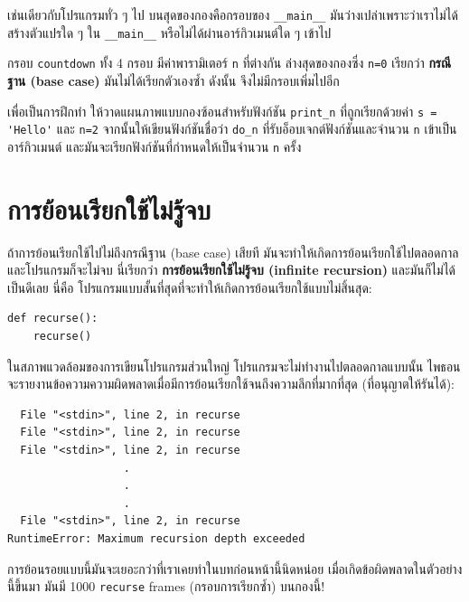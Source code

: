 เช่นเดียวกับโปรแกรมทั่ว ๆ ไป บนสุดของกองคือกรอบของ \verb"__main__" มันว่างเปล่าเพราะว่าเราไม่ได้สร้างตัวแปรใด ๆ ใน \verb"__main__"
หรือไม่ได้ผ่านอาร์กิวเมนต์ใด ๆ เข้าไป

กรอบ {\tt countdown} ทั้ง 4 กรอบ มีค่าพารามิเตอร์ {\tt n} ที่ต่างกัน
ล่างสุดของกองซึ่ง {\tt n=0} เรียกว่า {\bf กรณีฐาน (base case)} มันไม่ได้เรียกตัวเองซ้ำ 
ดังนั้น จึงไม่มีกรอบเพิ่มไปอีก


เพื่อเป็นการฝึกทำ ให้วาดแผนภาพแบบกองซ้อนสำหรับฟังก์ชัน \verb|print_n| ที่ถูกเรียกด้วยค่า 
\verb"s = 'Hello'" และ {\tt n=2} จากนั้นให้เขียนฟังก์ชันชื่อว่า \verb"do_n" 
ที่รับอ็อบเจกต์ฟังก์ชันและจำนวน {\tt n} เข้าเป็นอาร์กิวเมนต์ และมันจะเรียกฟังก์ชันที่กำหนดให้เป็นจำนวน {\tt n} ครั้ง



\section{การย้อนเรียกใช้ไม่รู้จบ} %

ถ้าการย้อนเรียกใช้ไปไม่ถึงกรณีฐาน (base case) เสียที มันจะทำให้เกิดการย้อนเรียกใช้ไปตลอดกาล
และโปรแกรมก็จะไม่จบ นี่เรียกว่า {\bf การย้อนเรียกใช้ไม่รู้จบ (infinite recursion)}
และมันก็ไม่ได้เป็นดีเลย นี่คือ โปรแกรมแบบสั้นที่สุดที่จะทำให้เกิดการย้อนเรียกใช้แบบไม่สิ้นสุด:

\begin{verbatim}
def recurse():
    recurse()
\end{verbatim}
%
ในสภาพแวดล้อมของการเขียนโปรแกรมส่วนใหญ่ โปรแกรมจะไม่ทำงานไปตลอดกาลแบบนั้น
ไพธอนจะรายงานข้อความความผิดพลาดเมื่อมีการย้อนเรียกใช้จนถึงความลึกที่มากที่สุด (ที่อนุญาตให้รันได้):

\begin{verbatim}
  File "<stdin>", line 2, in recurse
  File "<stdin>", line 2, in recurse
  File "<stdin>", line 2, in recurse
                  .   
                  .
                  .
  File "<stdin>", line 2, in recurse
RuntimeError: Maximum recursion depth exceeded
\end{verbatim}
%
การย้อนรอยแบบนี้มันจะเยอะกว่าที่เราเคยทำในบทก่อนหน้านี้นิดหน่อย 
เมื่อเกิดข้อผิดพลาดในตัวอย่างนี้ขึ้นมา มันมี 1000 {\tt recurse} frames (กรอบการเรียกซ้ำ) บนกองนี้!

